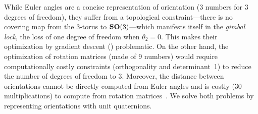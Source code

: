 While Euler angles are a concise representation of orientation ($3$ numbers for $3$ degrees of freedom), they suffer from a topological constraint---there is no covering map from the $3$-torus to $\mathrm{\mathbf{SO}}(3)$---which manifests itself in the \textit{gimbal lock}, the loss of one degree of freedom when $\theta_2=0$. %
This makes their optimization by gradient descent () problematic.
On the other hand, the optimization of rotation matrices (made of $9$ numbers) would require computationally costly constraints (orthogonality and determinant~1) to reduce the number of degrees of freedom to $3$.
Moreover, the distance between orientations cannot be directly computed from Euler angles and is costly (30 multiplications) to compute from rotation matrices~\cite{huynh2009metrics}.
We solve both problems by representing orientations with unit quaternions.

